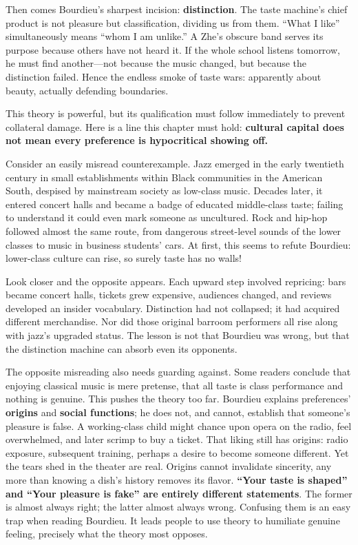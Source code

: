 Then comes Bourdieu's sharpest incision: \textbf{distinction}. The taste machine's chief product is not pleasure but classification, dividing us from them. ``What I like'' simultaneously means ``whom I am unlike.'' A Zhe's obscure band serves its purpose because others have not heard it. If the whole school listens tomorrow, he must find another---not because the music changed, but because the distinction failed. Hence the endless smoke of taste wars: apparently about beauty, actually defending boundaries.

This theory is powerful, but its qualification must follow immediately to prevent collateral damage. Here is a line this chapter must hold: \textbf{cultural capital does not mean every preference is hypocritical showing off.}

Consider an easily misread counterexample. Jazz emerged in the early twentieth century in small establishments within Black communities in the American South, despised by mainstream society as low-class music. Decades later, it entered concert halls and became a badge of educated middle-class taste; failing to understand it could even mark someone as uncultured. Rock and hip-hop followed almost the same route, from dangerous street-level sounds of the lower classes to music in business students' cars. At first, this seems to refute Bourdieu: lower-class culture can rise, so surely taste has no walls!

Look closer and the opposite appears. Each upward step involved repricing: bars became concert halls, tickets grew expensive, audiences changed, and reviews developed an insider vocabulary. Distinction had not collapsed; it had acquired different merchandise. Nor did those original barroom performers all rise along with jazz's upgraded status. The lesson is not that Bourdieu was wrong, but that the distinction machine can absorb even its opponents.

The opposite misreading also needs guarding against. Some readers conclude that enjoying classical music is mere pretense, that all taste is class performance and nothing is genuine. This pushes the theory too far. Bourdieu explains preferences' \textbf{origins} and \textbf{social functions}; he does not, and cannot, establish that someone's pleasure is false. A working-class child might chance upon opera on the radio, feel overwhelmed, and later scrimp to buy a ticket. That liking still has origins: radio exposure, subsequent training, perhaps a desire to become someone different. Yet the tears shed in the theater are real. Origins cannot invalidate sincerity, any more than knowing a dish's history removes its flavor. \textbf{``Your taste is shaped'' and ``Your pleasure is fake'' are entirely different statements}. The former is almost always right; the latter almost always wrong. Confusing them is an easy trap when reading Bourdieu. It leads people to use theory to humiliate genuine feeling, precisely what the theory most opposes.

